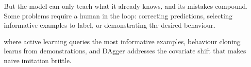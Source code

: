 But the model can only teach what it already knows, and its mistakes compound. Some problems require a human in the loop: correcting predictions, selecting informative examples to label, or demonstrating the desired behaviour.

 where active learning queries the most informative examples, behaviour cloning learns from demonstrations, and DAgger addresses the covariate shift that makes naive imitation brittle.

